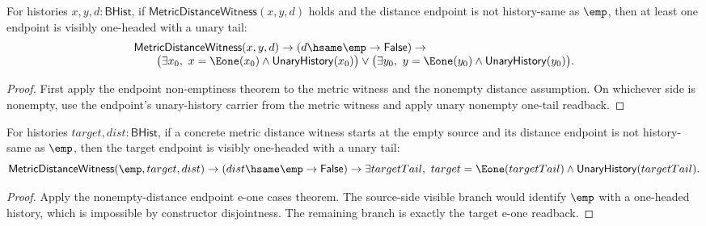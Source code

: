 \begin{theorem}
\label{thm:metric-distance-witness-nonempty-distance-endpoint-e1-cases}
For histories $x,y,d:\mathsf{BHist}$, if
$\mathsf{MetricDistanceWitness}(x,y,d)$ holds and the distance endpoint is not
history-same as $\emp$, then at least one endpoint is visibly one-headed with a
unary tail:
$$
\begin{array}{l}
\mathsf{MetricDistanceWitness}(x,y,d)\to
(d\hsame\emp\to\mathsf{False})\to\\
\qquad
\bigl(\exists x_0,\ x=\Eone(x_0)\land\mathsf{UnaryHistory}(x_0)\bigr)
\vee
\bigl(\exists y_0,\ y=\Eone(y_0)\land\mathsf{UnaryHistory}(y_0)\bigr).
\end{array}
$$
\end{theorem}
\begin{proof}
First apply the endpoint non-emptiness theorem to the metric witness and the
nonempty distance assumption. On whichever side is nonempty, use the endpoint's
unary-history carrier from the metric witness and apply unary nonempty
one-tail readback.
\end{proof}

\begin{theorem}
\label{thm:metric-distance-witness-empty-source-nonempty-distance-target-e1-cases}
For histories $target,dist:\mathsf{BHist}$, if a concrete metric distance
witness starts at the empty source and its distance endpoint is not
history-same as $\emp$, then the target endpoint is visibly one-headed with a
unary tail:
$$
\mathsf{MetricDistanceWitness}(\emp,target,dist)\to
(dist\hsame\emp\to\mathsf{False})\to
\exists targetTail,\ target=\Eone(targetTail)\land
\mathsf{UnaryHistory}(targetTail).
$$
\end{theorem}
\begin{proof}
Apply the nonempty-distance endpoint e-one cases theorem. The source-side
visible branch would identify $\emp$ with a one-headed history, which is
impossible by constructor disjointness. The remaining branch is exactly the
target e-one readback.
\end{proof}

